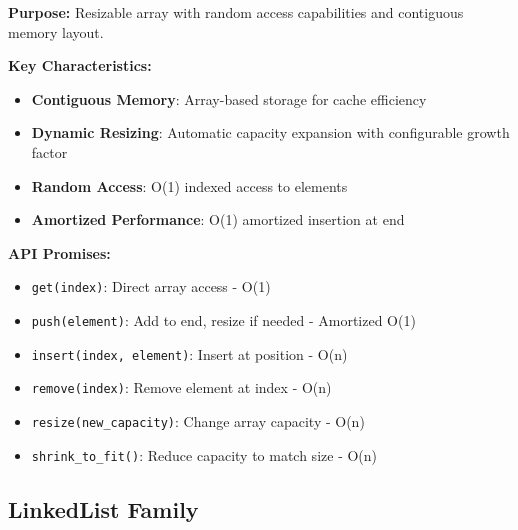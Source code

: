 \documentclass[11pt,a4paper]{article}
\begin{document}
\textbf{Purpose:} Resizable array with random access capabilities and contiguous memory layout.

\textbf{Key Characteristics:}
\begin{itemize}
    \item \textbf{Contiguous Memory}: Array-based storage for cache efficiency
    \item \textbf{Dynamic Resizing}: Automatic capacity expansion with configurable growth factor
    \item \textbf{Random Access}: O(1) indexed access to elements
    \item \textbf{Amortized Performance}: O(1) amortized insertion at end
\end{itemize}

\textbf{API Promises:}
\begin{itemize}
    \item \texttt{get(index)}: Direct array access - O(1)
    \item \texttt{push(element)}: Add to end, resize if needed - Amortized O(1)
    \item \texttt{insert(index, element)}: Insert at position - O(n)
    \item \texttt{remove(index)}: Remove element at index - O(n)
    \item \texttt{resize(new\_capacity)}: Change array capacity - O(n)
    \item \texttt{shrink\_to\_fit()}: Reduce capacity to match size - O(n)
\end{itemize}

\subsection{LinkedList Family}
\end{document}
